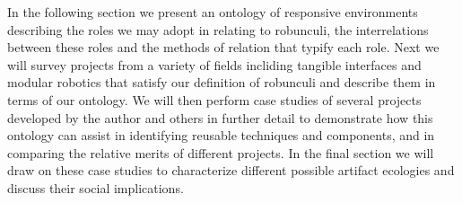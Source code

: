 In the following section we present an ontology of responsive environments describing the roles we may adopt in relating to robunculi, the interrelations between these roles and the methods of relation that typify each role. Next we will survey projects from a variety of fields incliding tangible interfaces and modular robotics that satisfy our definition of robunculi and describe them in terms of our ontology. We will then perform case studies of several projects developed by the author and others in further detail to demonstrate how this ontology can assist in identifying reusable techniques and components, and in comparing the relative merits of different projects. In the final section we will draw on these case studies to characterize different possible artifact ecologies and discuss their social implications.




